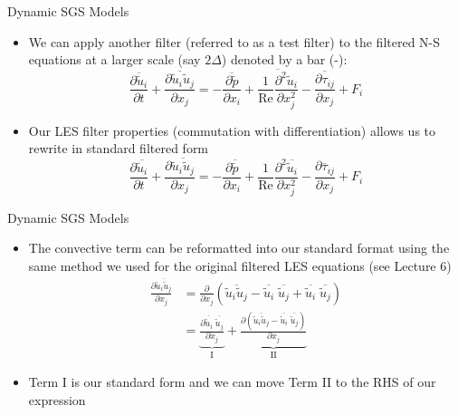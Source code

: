 \begin{frame}{Dynamic SGS Models}
\begin{itemize}
	\item   We can apply another filter (referred to as a test filter) to the filtered N-S equations at a larger scale (say $2\Delta$) denoted by a bar (-):
	$$\overline{\frac{\partial \widetilde{u}_i}{\partial t}} + \overline{\frac{\partial \widetilde{u}_i \widetilde{u}_j}{\partial x_j}} = - \overline{\frac{\partial \widetilde{p}}{\partial x_i}} + \overline{\frac{1}{\text{Re}}\frac{\partial^2\widetilde{u}_i}{\partial x_j^2}} - \overline{\frac{\partial \tau_{ij}}{\partial x_j}} + F_i$$
	\item Our LES filter properties (commutation with differentiation) allows us to rewrite in standard filtered form
	$$\frac{\partial \overline{\widetilde{u}_i}}{\partial t} + \frac{\partial \overline{\widetilde{u}_i \widetilde{u}_j}}{\partial x_j} = - \frac{\partial \overline{\widetilde{p}}}{\partial x_i} + \frac{1}{\text{Re}}\frac{\partial^2\overline{\widetilde{u}_i}}{\partial x_j^2} - \frac{\partial \overline{\tau}_{ij}}{\partial x_j} + F_i$$
\end{itemize}

\end{frame}

\begin{frame}{Dynamic SGS Models}
\begin{itemize}
	\item The convective term can be reformatted into our standard format using the same method we used for the original filtered LES equations (see Lecture 6)
	\begin{align*}
	\frac{\partial \overline{\widetilde{u}_i \widetilde{u}_j}}{\partial x_j} &= \frac{\partial}{\partial x_j}\left(\overline{\widetilde{u}_i \widetilde{u}_j} - \overline{\widetilde{u}_i}\;\overline{\widetilde{u}_j} + \overline{\widetilde{u}_i}\;\overline{\widetilde{u}_j}\right)\\&= \underbrace{\frac{\partial \overline{\widetilde{u}_i}\;\overline{\widetilde{u}_j}}{\partial x_j}}_{\text{I}} + \underbrace{\frac{\partial \left(\overline{\widetilde{u}_i \widetilde{u}_j} - \overline{\widetilde{u}_i}\; \overline{\widetilde{u}_j}\right)}{\partial x_j}}_{\text{II}}
	\end{align*}
	\item Term I is our standard form and we can move Term II to the RHS of our expression
\end{itemize}

\end{frame}

